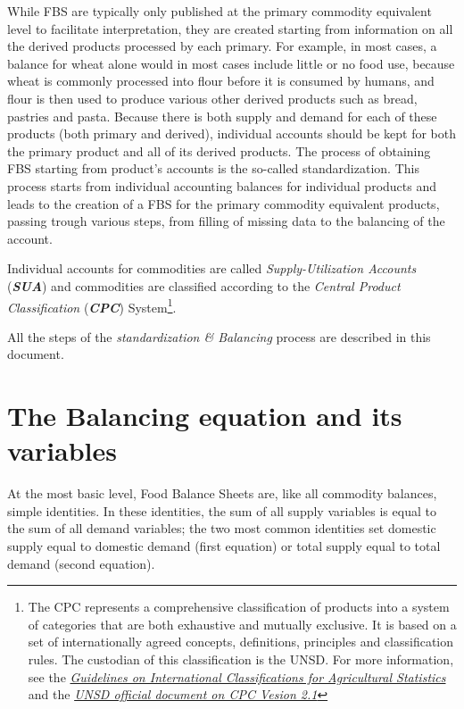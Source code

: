 \documentclass[]{article}
\let\rmarkdownfootnote\footnote%
\def\footnote{\protect\rmarkdownfootnote}
\begin{document}
While FBS are typically only published at the primary commodity
equivalent level to facilitate interpretation, they are created starting
from information on all the derived products processed by each primary.
For example, in most cases, a balance for wheat alone would in most
cases include little or no food use, because wheat is commonly processed
into flour before it is consumed by humans, and flour is then used to
produce various other derived products such as bread, pastries and
pasta. Because there is both supply and demand for each of these
products (both primary and derived), individual accounts should be kept
for both the primary product and all of its derived products. The
process of obtaining FBS starting from product's accounts is the
so-called standardization. This process starts from individual
accounting balances for individual products and leads to the creation of
a FBS for the primary commodity equivalent products, passing trough
various steps, from filling of missing data to the balancing of the
account.

Individual accounts for commodities are called \emph{Supply-Utilization
Accounts} (\textbf{\emph{SUA}}) and commodities are classified according
to the \emph{Central Product Classification} (\textbf{\emph{CPC}})
System\footnote{The CPC represents a comprehensive classification of
  products into a system of categories that are both exhaustive and
  mutually exclusive. It is based on a set of internationally agreed
  concepts, definitions, principles and classification rules. The
  custodian of this classification is the UNSD. For more information,
  see the
  \href{http://gsars.org/wp-content/uploads/2015/12/Guidelines-for-Int-Classifications-on-Agricultural-Statistics-web.pdf}{\emph{Guidelines
  on International Classifications for Agricultural Statistics}} and the
  \href{https://unstats.un.org/unsd/cr/downloads/CPCv2.1_complete\%28PDF\%29_English.pdf}{\emph{UNSD
  official document on CPC Vesion 2.1}}}.

All the steps of the \emph{standardization \& Balancing} process are
described in this document.

\section*{The Balancing equation and its
variables}\label{the-balancing-equation-and-its-variables}

At the most basic level, Food Balance Sheets are, like all commodity
balances, simple identities. In these identities, the sum of all supply
variables is equal to the sum of all demand variables; the two most
common identities set domestic supply equal to domestic demand (first
equation) or total supply equal to total demand (second equation).
\end{document}
